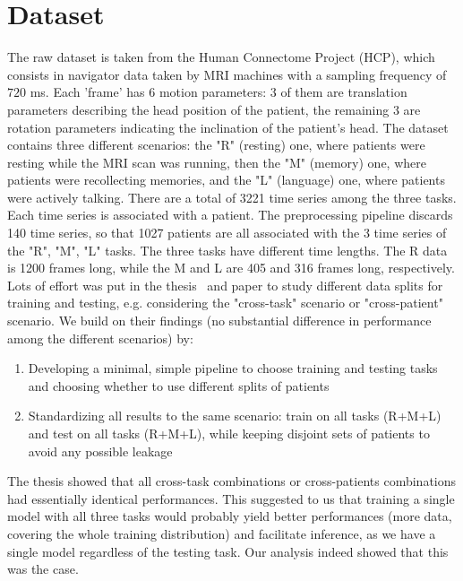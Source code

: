 \documentclass[
reprint,
aps,
prd,
superscriptaddress,
nofootinbib
]{revtex4-2}
\begin{document}
\section{Dataset}

The raw dataset is taken from the Human Connectome Project (HCP), which consists in navigator data taken by MRI machines with a sampling frequency of $720$ ms. Each 'frame' has 6 motion parameters: 3 of them are translation parameters describing the head position of the patient, the remaining 3 are rotation parameters indicating the inclination of the patient's head. The dataset contains three different scenarios: the "R" (resting) one, where patients were resting while the MRI scan was running, then the "M" (memory) one, where patients were recollecting memories, and the "L" (language) one, where patients were actively talking.
There are a total of 3221 time series among the three tasks. Each time series is associated with a patient. The preprocessing pipeline discards 140 time series, so that 1027 patients are all associated with the 3 time series of the "R", "M", "L" tasks. The three tasks have different time lengths. The R data is 1200 frames long, while the M and L are 405 and 316 frames long, respectively.
Lots of effort was put in the thesis~\cite{Nistico2025Recentre} and paper to study different data splits for training and testing, e.g. considering the "cross-task" scenario or "cross-patient" scenario.
We build on their findings (no substantial difference in performance among the different scenarios) by: 

\begin{enumerate}
    \item Developing a minimal, simple pipeline to choose training and testing tasks and choosing whether to use different splits of patients
    \item Standardizing all results to the same scenario: train on all tasks (R+M+L) and test on all tasks (R+M+L), while keeping disjoint sets of patients to avoid any possible leakage
\end{enumerate}

The thesis showed that all cross-task combinations or cross-patients combinations had essentially identical performances. This suggested to us that training a single model with all three tasks would probably yield better performances (more data, covering the whole training distribution) and facilitate inference, as we have a single model regardless of the testing task. Our analysis indeed showed that this was the case.
\end{document}
